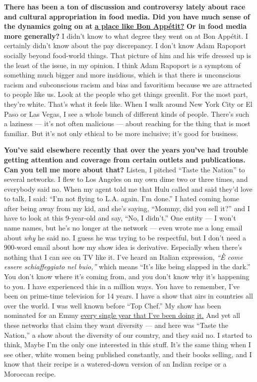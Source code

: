 \textbf{There has been a ton of discussion and controversy lately about
race and cultural appropriation in food media. Did you have much sense
of the dynamics going on at}
\textbf{\href{http://nytimes3xbfgragh.onion\#tooltip-3}{a place like Bon
Appétit?}} \textbf{Or in food media more generally?} I didn't know to
what degree they went on at Bon Appétit. I certainly didn't know about
the pay discrepancy. I don't know Adam Rapoport socially beyond
food-world things. That picture of him and his wife dressed up is the
least of the issue, in my opinion. I think Adam Rapoport is a symptom of
something much bigger and more insidious, which is that there is
unconscious racism and subconscious racism and bias and favoritism
because we are attracted to people like us. Look at the people who get
things greenlit. For the most part, they're white. That's what it feels
like. When I walk around New York City or El Paso or Las Vegas, I see a
whole bunch of different kinds of people. There's such a laziness ---
it's not often malicious --- about reaching for the thing that is most
familiar. But it's not only ethical to be more inclusive; it's good for
business.

\textbf{You've said elsewhere recently that over the years you've had
trouble getting attention and coverage from certain outlets and
publications. Can you tell me more about that?} Listen, I pitched
``Taste the Nation'' to several networks. I flew to Los Angeles on my
own dime two or three times, and everybody said no. When my agent told
me that Hulu called and said they'd love to talk, I said: ``I'm not
flying to L.A. again. I'm done.'' I hated coming home after being away
from my kid, and she's saying, ``Mommy, did you sell it?'' and I have to
look at this 9-year-old and say, ``No, I didn't.'' One entity --- I
won't name names, but he's no longer at the network --- even wrote me a
long email about \emph{why} he said no. I guess he was trying to be
respectful, but I don't need a 900-word email about how my show idea is
derivative. Especially when there's nothing that I can see on TV like
it. I've heard an Italian expression, \emph{``È come essere
schiaffeggiato nel buio,''} which means ``It's like being slapped in the
dark.'' You don't know where it's coming from, and you don't know why
it's happening to you. I have experienced this in a million ways. You
have to remember, I've been on prime-time television for 14 years. I
have a show that airs in countries all over the world. I was well known
before ``Top Chef.'' My show has been nominated for an Emmy
\href{http://nytimes3xbfgragh.onion\#tooltip-4}{every single year that
I've been doing it.} And yet all these networks that claim they want
diversity --- and here was ``Taste the Nation,'' a show about the
diversity of our country, and they said no. I started to think, Maybe
I'm the only one interested in this stuff. It's the same thing when I
see other, white women being published constantly, and their books
selling, and I know that their recipe is a watered-down version of an
Indian recipe or a Moroccan recipe.

